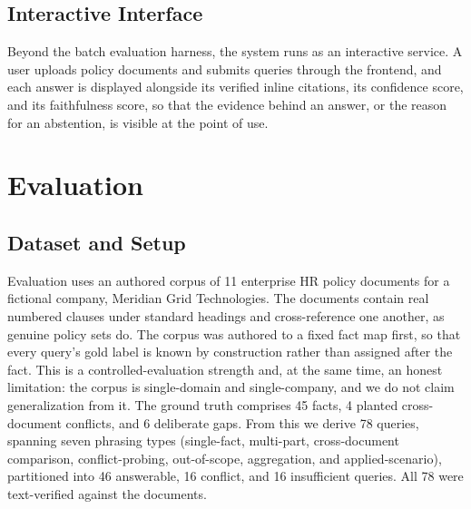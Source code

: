 \documentclass[conference]{IEEEtran}
\begin{document}
\subsection{Interactive Interface}
Beyond the batch evaluation harness, the system runs as an interactive
service. A user uploads policy documents and submits queries through the
frontend, and each answer is displayed alongside its verified inline
citations, its confidence score, and its faithfulness score, so that the
evidence behind an answer, or the reason for an abstention, is visible at
the point of use.

\section{Evaluation}
\label{sec:eval}

\subsection{Dataset and Setup}
Evaluation uses an authored corpus of 11 enterprise HR policy documents for
a fictional company, Meridian Grid Technologies. The documents contain real
numbered clauses under standard headings and cross-reference one another, as
genuine policy sets do. The corpus was authored to a fixed fact map first,
so that every query's gold label is known by construction rather than
assigned after the fact. This is a controlled-evaluation strength and, at
the same time, an honest limitation: the corpus is single-domain and
single-company, and we do not claim generalization from it. The ground
truth comprises 45 facts, 4 planted cross-document conflicts, and 6
deliberate gaps. From this we derive 78 queries, spanning seven phrasing
types (single-fact, multi-part, cross-document comparison, conflict-probing,
out-of-scope, aggregation, and applied-scenario), partitioned into 46
answerable, 16 conflict, and 16 insufficient queries. All 78 were
text-verified against the documents.
\end{document}
